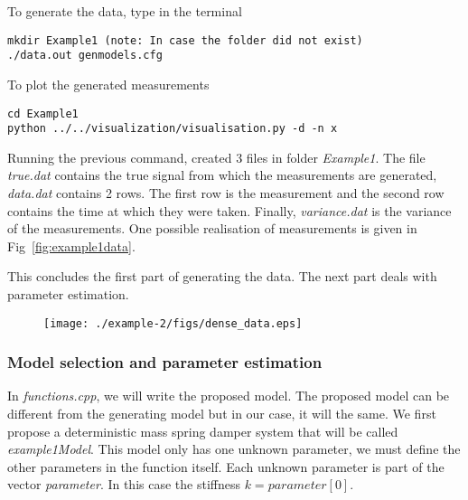 \documentclass{article}
\begin{document}
To generate the data, type in the terminal


\begin{lstlisting}
mkdir Example1 (note: In case the folder did not exist)
./data.out genmodels.cfg
\end{lstlisting}

To plot the generated measurements

\begin{lstlisting}
cd Example1
python ../../visualization/visualisation.py -d -n x
\end{lstlisting}

Running the previous command, created 3 files in folder {\em Example1}. The file {\em true.dat} contains the true signal from which the measurements are generated, {\em data.dat}  contains 2 rows. The first row is the measurement and the second row contains the time at which they were taken. Finally, {\em variance.dat} is the variance of the measurements. One possible realisation of measurements is given in Fig~\ref{fig:example1data}.



This concludes the first part of generating the data. The next part deals with parameter estimation. 
\begin{figure}
\texttt{[image: ./example-2/figs/dense\_data.eps]}
\end{figure}

\subsubsection{Model selection and parameter estimation}

In {\em functions.cpp}, we will write the proposed model. The proposed model can be different from the generating model but in our case, it will the same. We first propose a deterministic mass spring damper system that will be called {\em example1Model}. This model only has one unknown parameter, we must define the other parameters in the function itself. Each unknown parameter is part of the vector {\em parameter}. In this case the stiffness $k = parameter[0]$. 
\end{document}

